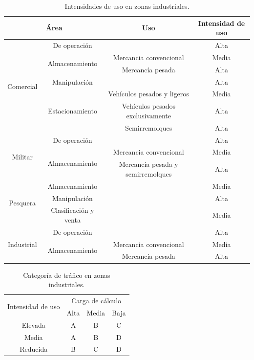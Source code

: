 \documentclass[12pt,titlepage,openright]{report}
\begin{document}
\begin{table}[!htb]
\centering
\begin{tabular}{|c|c|c|c|}
\hline
\multicolumn{2}{|c|}{Área} & Uso & Intensidad de uso\\ \hline
\multirow{7}{*}{Comercial} & De operación &  & Alta\\ \cline{2-4}
& \multirow{2}{*}{Almacenamiento} & Mercancia convencional & Media\\ \cline{3-4}
& & Mercancía pesada & Alta\\ \cline{2-4}
& Manipulación & & Alta\\ \cline{2-4}
& \multirow{3}{*}{Estacionamiento} & Vehículos pesados y ligeros & Media\\ \cline{3-4}
& & Vehículos pesados exclusivamente & Alta\\ \cline{3-4}
& & Semirremolques & Alta\\ \hline
\multirow{3}{*}{Militar} & De operación &  & Alta\\ \cline{2-4}
& \multirow{2}{*}{Almacenamiento} & Mercancia convencional & Media\\ \cline{3-4}
& & Mercancía pesada y semirremolques & Alta\\ \hline
\multirow{3}{*}{Pesquera} & Almacenamiento &  & Media\\ \cline{2-4}
& Manipulación & & Alta\\ \cline{2-4}
& Clasificación y venta & & Media\\ \hline
\multirow{3}{*}{Industrial} & De operación &  & Alta\\ \cline{2-4}
& \multirow{2}{*}{Almacenamiento} & Mercancia convencional & Media\\ \cline{3-4}
& & Mercancía pesada & Alta\\ \hline
\end{tabular}
\caption{Intensidades de uso en zonas industriales.}
\label{categoriadetraficoenzonasindustrialesintensidades}
\end{table}


\begin{table}[!htb]
\centering
\begin{tabular}{|c|c|c|c|}
\hline
\multirow{2}{*}{Intensidad de uso} & \multicolumn{3}{c|}{Carga de cálculo} \\ \cline{2-4}
 & Alta & Media & Baja\\ \hline
Elevada & A & B & C\\ \hline
Media & A & B & D\\ \hline
Reducida & B & C & D\\ \hline
\end{tabular}
\caption{Categoría de tráfico en zonas industriales.}
\label{categoriadetraficoenzonasindustriales}
\end{table}
\end{document}
